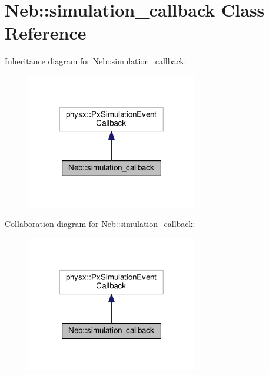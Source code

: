 \hypertarget{classNeb_1_1simulation__callback}{\section{Neb\-:\-:simulation\-\_\-callback Class Reference}
\label{classNeb_1_1simulation__callback}
}


Inheritance diagram for Neb\-:\-:simulation\-\_\-callback\-:
\nopagebreak
\begin{figure}[H]
\begin{center}
\leavevmode
\includegraphics[width=212pt]{classNeb_1_1simulation__callback__inherit__graph}
\end{center}
\end{figure}


Collaboration diagram for Neb\-:\-:simulation\-\_\-callback\-:
\nopagebreak
\begin{figure}[H]
\begin{center}
\leavevmode
\includegraphics[width=212pt]{classNeb_1_1simulation__callback__coll__graph}
\end{center}
\end{figure}
